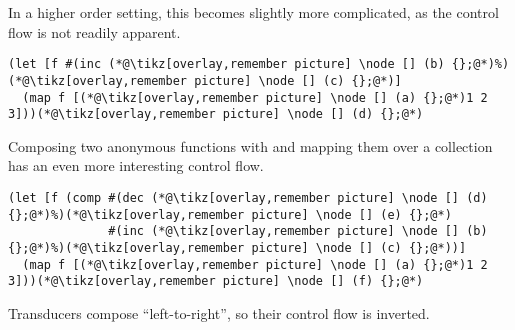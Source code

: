 \documentclass[9pt]{extarticle}
\begin{document}
In a higher order setting, this becomes slightly more complicated, as
the control flow is not readily apparent.

\begin{lstlisting}
(let [f #(inc (*@\tikz[overlay,remember picture] \node [] (b) {};@*)%)(*@\tikz[overlay,remember picture] \node [] (c) {};@*)]
  (map f [(*@\tikz[overlay,remember picture] \node [] (a) {};@*)1 2 3]))(*@\tikz[overlay,remember picture] \node [] (d) {};@*)
\end{lstlisting}

Composing two anonymous functions with  and mapping
them over a collection has an even more interesting control flow.

\begin{lstlisting}
(let [f (comp #(dec (*@\tikz[overlay,remember picture] \node [] (d) {};@*)%)(*@\tikz[overlay,remember picture] \node [] (e) {};@*)
              #(inc (*@\tikz[overlay,remember picture] \node [] (b) {};@*)%)(*@\tikz[overlay,remember picture] \node [] (c) {};@*))]
  (map f [(*@\tikz[overlay,remember picture] \node [] (a) {};@*)1 2 3]))(*@\tikz[overlay,remember picture] \node [] (f) {};@*)
\end{lstlisting}

%

Transducers compose ``left-to-right'', so their control flow is inverted.
\end{document}
